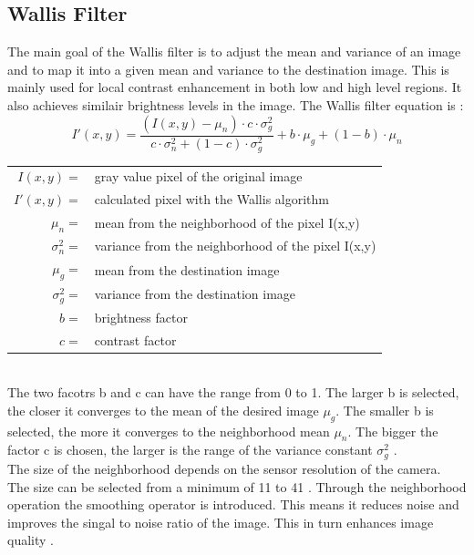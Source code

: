 \subsection{Wallis Filter}\label{ch:th_wallis_filter}
The main goal of the Wallis filter is to adjust the mean and variance of an image and to map it into a given mean and variance to the destination image. This is mainly used for local contrast enhancement in both low and high level regions. It also achieves similair brightness levels in the image.
The Wallis filter equation is \cite{wallis_filter}:
\begin{equation}
    I'(x,y) = \frac{( I(x,y) - \mu_{n})\cdot c \cdot \sigma_{g}^{2}}{c \cdot \sigma_{n}^{2} + (1 - c) \cdot \sigma_{g}^{2}} + b \cdot \mu_{g} + (1 - b) \cdot \mu_{n}
    \label{eq:wallis_filter}
\end{equation} 

\begin{tabular}{rl}
    $I(x,y)         =$ & gray value pixel of the original image \\
    $I'(x,y)        =$ & calculated pixel with the Wallis algorithm \\
    $\mu_{n}        =$ & mean from the neighborhood of the pixel I(x,y) \\
    $\sigma_{n}^{2} =$ & variance from the neighborhood of the pixel I(x,y) \\
    $\mu_{g}        =$ & mean from the destination image \\
    $\sigma_{g}^{2} =$ & variance from the destination image \\
    $b              =$ & brightness factor \\
    $c              =$ & contrast factor \\
\end{tabular} \\

The two facotrs b and c can have the range from 0 to 1. The larger b is selected, the closer it converges to the mean of the desired image $\mu_{g}$. The smaller b is selected, the more it converges to the neighborhood mean $\mu_{n}$.
The bigger the factor c is chosen, the larger is the range of the variance constant $\sigma_{g}^{2}$ \cite{wallis_filter}. \\
The size of the neighborhood depends on the sensor resolution of the camera. The size can be selected from a minimum of 11 to 41 \cite{zeng_2018}. Through the neighborhood operation the smoothing operator is introduced. This means it reduces noise and improves the singal to noise ratio of the image. This in turn enhances image quality \cite{wallis_filter}.


